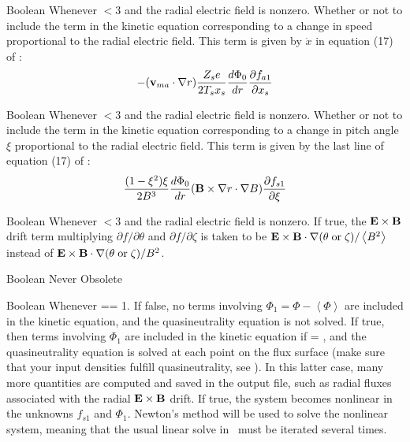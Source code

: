 \myhrule

{Boolean}
{\true}
{Whenever  $<3$ and the radial electric field is nonzero.}
{Whether or not to include the term in the kinetic equation corresponding to a change
in speed proportional to the radial electric field.  This term is given by $\dot{x}$ in
equation (17) of \cite{sfincsPaper}:}
\begin{equation}
-({\mathbf v}_{ma} \cdot\nabla r) \frac{Z_s e}{2 T_s x_s} \frac{d\Phi_0}{dr} \frac{\partial f_{a1}}{\partial x_s}
\end{equation}
\myhrule

{Boolean}
{\true}
{Whenever  $<3$ and the radial electric field is nonzero.}
{Whether or not to include the term in the kinetic equation corresponding to a change
in pitch angle $\xi$ proportional to the radial electric field.  This term is given by the last line of
equation (17) of \cite{sfincsPaper}:}
\begin{equation}
\frac{(1-\xi^2)\xi}{2B^3} \frac{d\Phi_0}{dr}({\mathbf B}\times\nabla r\cdot\nabla B)
 \frac{\partial f_{s1}}{\partial \xi}
\end{equation}

\myhrule

{Boolean}
{\false}
{Whenever  $<3$ and the radial electric field is nonzero.}
{If true, the ${\mathbf E}\times{\mathbf B}$ drift term 
multiplying $\partial f/\partial \theta$ and  $\partial f/\partial \zeta$
is taken to be ${\mathbf E}\times{\mathbf B}\cdot \nabla (\theta \;\mbox{or} \;\zeta) / \left< B^2 \right>$
instead of 
 ${\mathbf E}\times{\mathbf B}\cdot \nabla (\theta \;\mbox{or} \;\zeta) /B^2$.
}

\myhrule

{Boolean}
{\false}
{Never}
{Obsolete}

\myhrule

{Boolean}
{\false}
{Whenever  == 1.}
{If false, no terms involving $\Phi_1 = \Phi-\left<\Phi\right>$ are included in the kinetic equation,
and the quasineutrality equation is not solved.  If true, then terms involving $\Phi_1$ are included
in the kinetic equation if  = \true, and the quasineutrality equation is solved at each point on the flux surface (make sure that your input densities fulfill quasineutrality, see ). 
In this latter case, many more quantities are computed and saved in the output file, such as radial fluxes
associated with the radial ${\mathbf E}\times{\mathbf B}$ drift.\newline
If true, the system becomes nonlinear in the unknowns $f_{s1}$ and $\Phi_1$. 
Newton's method will be used to solve the nonlinear system, meaning that the usual linear solve in \sfincs~must be iterated several times.
}

